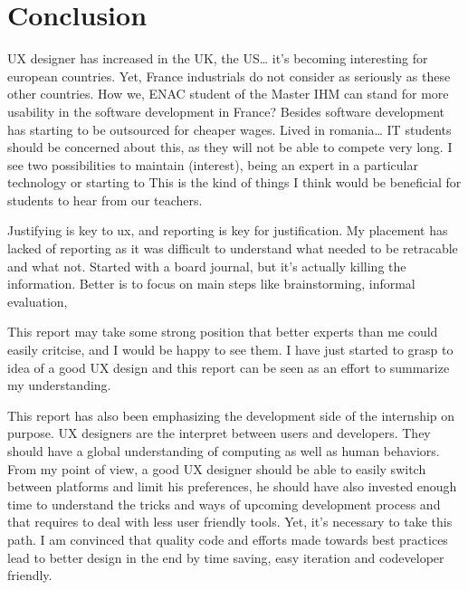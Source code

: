\documentclass[]{article}
\begin{document}
\section{Conclusion}\label{conclusion}

UX designer has increased in the UK, the US\ldots{} it's becoming
interesting for european countries. Yet, France industrials do not
consider as seriously as these other countries. How we, ENAC student of
the Master IHM can stand for more usability in the software development
in France? Besides software development has starting to be outsourced
for cheaper wages. Lived in romania\ldots{} IT students should be
concerned about this, as they will not be able to compete very long. I
see two possibilities to maintain (interest), being an expert in a
particular technology or starting to This is the kind of things I think
would be beneficial for students to hear from our teachers.

Justifying is key to ux, and reporting is key for justification. My
placement has lacked of reporting as it was difficult to understand what
needed to be retracable and what not. Started with a board journal, but
it's actually killing the information. Better is to focus on main steps
like brainstorming, informal evaluation,

This report may take some strong position that better experts than me
could easily critcise, and I would be happy to see them. I have just
started to grasp to idea of a good UX design and this report can be seen
as an effort to summarize my understanding.

This report has also been emphasizing the development side of the
internship on purpose. UX designers are the interpret between users and
developers. They should have a global understanding of computing as well
as human behaviors. From my point of view, a good UX designer should be
able to easily switch between platforms and limit his preferences, he
should have also invested enough time to understand the tricks and ways
of upcoming development process and that requires to deal with less user
friendly tools. Yet, it's necessary to take this path. I am convinced
that quality code and efforts made towards best practices lead to better
design in the end by time saving, easy iteration and codeveloper
friendly.
\end{document}
